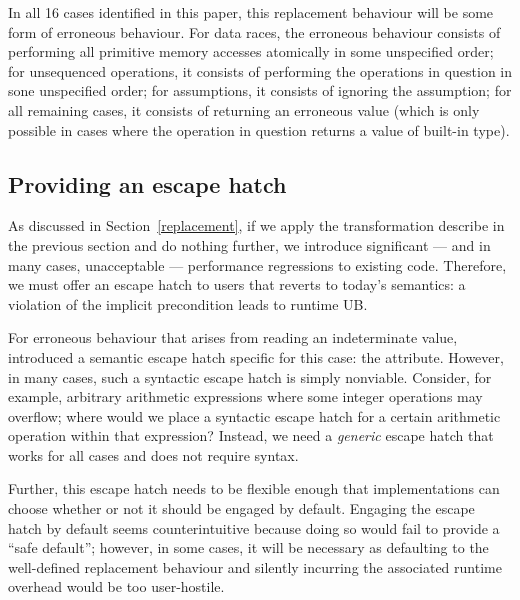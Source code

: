 In all 16 cases identified in this paper, this replacement behaviour will be some form of erroneous behaviour. For data races, the erroneous behaviour consists of performing all primitive memory accesses atomically in some unspecified order; 
for unsequenced operations, it consists of performing the operations in question in sone unspecified order; for assumptions, it consists of ignoring the assumption; for all remaining cases, it consists of returning an erroneous value (which is only possible in cases where the operation in question returns a value of built-in type).

\subsection{Providing an escape hatch}
\label{assume}

As discussed in Section~\ref{replacement}, if we apply the transformation describe in the previous section and do nothing further, we introduce significant --- and in many cases, unacceptable --- performance regressions to existing code. Therefore, we must offer an escape hatch to users that reverts to today's semantics: a violation of the implicit precondition leads to runtime UB.

For erroneous behaviour that arises from reading an indeterminate value, \cite{P2795R5} introduced a semantic escape hatch specific for this case: the \tcode{[[indeterminate]]} attribute. However, in many cases, such a syntactic escape hatch is simply nonviable. Consider, for example, arbitrary arithmetic expressions where some integer operations may overflow; where would we place a syntactic escape hatch for a certain arithmetic operation within that expression? Instead, we need a \emph{generic} escape hatch that works for all cases and does not require syntax.

Further, this escape hatch needs to be flexible enough that implementations can choose whether or not it should be engaged by default. Engaging the escape hatch by default seems counterintuitive because doing so would fail to provide a ``safe default''; however, in some cases, it will be necessary as defaulting to the well-defined replacement behaviour and silently incurring the associated runtime overhead would be too user-hostile.

